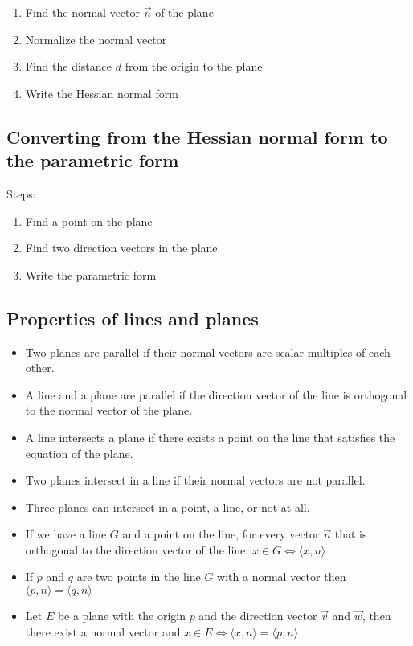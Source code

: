 \begin{enumerate}
	\item Find the normal vector \(\vec{n}\) of the plane
	\item Normalize the normal vector
	\item Find the distance \(d\) from the origin to the plane
	\item Write the Hessian normal form
\end{enumerate}

\subsection{Converting from the Hessian normal form to the parametric form}
Steps:
\begin{enumerate}
	\item Find a point on the plane
	\item Find two direction vectors in the plane
	\item Write the parametric form
\end{enumerate}

\subsection{Properties of lines and planes}
\begin{itemize}[label=\(-\)]
	\item Two planes are parallel if their normal vectors are scalar multiples of each other.
	\item A line and a plane are parallel if the direction vector of the line is orthogonal to the normal vector of the plane.
	\item A line intersects a plane if there exists a point on the line that satisfies the equation of the plane.
	\item Two planes intersect in a line if their normal vectors are not parallel.
	\item Three planes can intersect in a point, a line, or not at all.
	\item If we have a line \(G\) and a point on the line, for every vector \(\vec{n}\) that is orthogonal to the
	      direction vector of the line: \(x \in G \iff \langle x, n \rangle\)
	\item If \(p\) and \(q\) are two points in the line \(G\) with a normal vector then \(\langle p, n\rangle = \langle q, n\rangle\)
	\item Let \(E\) be a plane with the origin \(p\) and the direction vector \(\vec{v}\) and \(\vec{w}\), then there exist a normal vector and
	      \(x \in E \iff \langle x, n\rangle = \langle p, n \rangle\)
\end{itemize}

